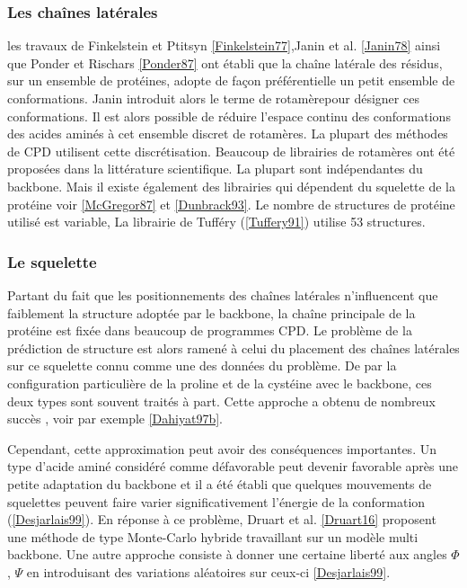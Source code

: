 \subsubsection{Les chaînes latérales}

les travaux de Finkelstein et Ptitsyn \ref{Finkelstein77},Janin et al. \ref{Janin78} ainsi que Ponder et Rischars \ref{Ponder87} ont établi que la chaîne latérale des résidus, sur un ensemble de protéines, adopte de façon préférentielle un petit ensemble de conformations. Janin introduit alors le terme de \og rotamère\fg pour désigner ces conformations. Il est alors possible de réduire l'espace continu des conformations des acides aminés à cet ensemble discret de rotamères. La plupart des méthodes de CPD utilisent cette discrétisation. Beaucoup de librairies de rotamères ont été proposées dans la littérature scientifique. La plupart sont indépendantes du backbone. Mais il existe également des librairies qui dépendent du squelette de la protéine voir \ref{McGregor87} et \ref{Dunbrack93}. Le nombre de structures de protéine utilisé est variable, La librairie de Tufféry (\ref{Tuffery91}) utilise 53 structures. 

\subsubsection{Le squelette}
Partant du fait que les positionnements des chaînes latérales n'influencent que faiblement la structure adoptée par le backbone, la chaîne principale de la protéine est fixée dans beaucoup de programmes CPD. Le problème de la prédiction de structure est alors ramené à celui du placement des chaînes latérales sur ce squelette connu comme une des données du problème. De par la configuration particulière de la proline et de la cystéine avec le backbone, ces deux types sont souvent traités à part. Cette approche a obtenu de nombreux succès , voir par exemple \ref{Dahiyat97b}.

Cependant, cette approximation peut avoir des conséquences importantes. Un type d'acide aminé considéré comme défavorable peut devenir favorable après une petite adaptation du backbone et il a été établi que quelques mouvements de squelettes peuvent faire varier significativement l'énergie de la conformation (\ref{Desjarlais99}).
En réponse à ce problème, Druart et al. \ref{Druart16} proposent une méthode de type Monte-Carlo hybride travaillant sur un modèle multi backbone. Une autre approche consiste à donner une certaine liberté aux angles $\Phi$ , $\Psi$ en introduisant des variations aléatoires sur ceux-ci \ref{Desjarlais99}.

